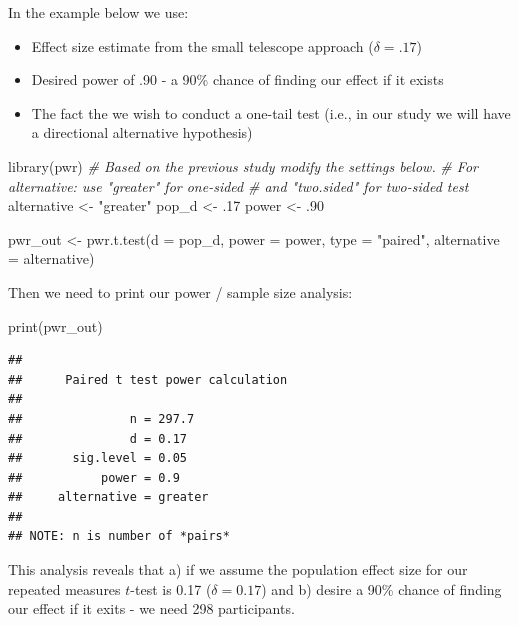 \documentclass[
]{krantz}
\makeatletter
\newenvironment{Shaded}{\begin{snugshade}}{\end{snugshade}}
\newcommand{\AttributeTok}[1]{\textcolor[rgb]{0.61,0.61,0.61}{#1}}
\newcommand{\CommentTok}[1]{\textcolor[rgb]{0.37,0.37,0.37}{\textit{#1}}}
\newcommand{\DecValTok}[1]{\textcolor[rgb]{0.06,0.06,0.06}{#1}}
\newcommand{\FunctionTok}[1]{\textcolor[rgb]{0,0,0}{#1}}
\newcommand{\NormalTok}[1]{#1}
\newcommand{\OtherTok}[1]{\textcolor[rgb]{0.37,0.37,0.37}{#1}}
\newcommand{\StringTok}[1]{\textcolor[rgb]{0.5,0.5,0.5}{#1}}
\newenvironment{kframe}{%
\medskip{}
\setlength{\fboxsep}{.8em}
 \def\at@end@of@kframe{}%
 \ifinner\ifhmode%
  \def\at@end@of@kframe{\end{minipage}}%
  \begin{minipage}{\columnwidth}%
 \fi\fi%
 \def\FrameCommand##1{\hskip\@totalleftmargin \hskip-\fboxsep
 \colorbox{shadecolor}{##1}\hskip-\fboxsep
     \hskip-\linewidth \hskip-\@totalleftmargin \hskip\columnwidth}%
 \MakeFramed {\advance\hsize-\width
   \@totalleftmargin\z@ \linewidth\hsize
   \@setminipage}}%
 {\par\unskip\endMakeFramed%
 \at@end@of@kframe}
\renewenvironment{Shaded}{\begin{kframe}}{\end{kframe}}
\makeatother
\begin{document}
In the example below we use:

\begin{itemize}
\item
  Effect size estimate from the small telescope approach (\(\delta = .17\))
\item
  Desired power of .90 - a 90\% chance of finding our effect if it exists
\item
  The fact the we wish to conduct a one-tail test (i.e., in our study we will have a directional alternative hypothesis)
\end{itemize}

\begin{Shaded}
\begin{Highlighting}[]
\FunctionTok{library}\NormalTok{(pwr)}
\CommentTok{\# Based on the previous study modify the settings below.}
\CommentTok{\# For alternative: use "greater" for one{-}sided }
\CommentTok{\# and "two.sided" for two{-}sided test}
\NormalTok{alternative }\OtherTok{\textless{}{-}} \StringTok{"greater"}
\NormalTok{pop\_d }\OtherTok{\textless{}{-}}\NormalTok{ .}\DecValTok{17}
\NormalTok{power }\OtherTok{\textless{}{-}}\NormalTok{ .}\DecValTok{90}

\NormalTok{pwr\_out }\OtherTok{\textless{}{-}} \FunctionTok{pwr.t.test}\NormalTok{(}\AttributeTok{d =}\NormalTok{ pop\_d, }
                      \AttributeTok{power =}\NormalTok{ power,}
                      \AttributeTok{type =} \StringTok{"paired"}\NormalTok{,}
                      \AttributeTok{alternative =}\NormalTok{ alternative)}
\end{Highlighting}
\end{Shaded}

Then we need to print our power / sample size analysis:

\begin{Shaded}
\begin{Highlighting}[]
\FunctionTok{print}\NormalTok{(pwr\_out)}
\end{Highlighting}
\end{Shaded}

\begin{verbatim}
## 
##      Paired t test power calculation 
## 
##               n = 297.7
##               d = 0.17
##       sig.level = 0.05
##           power = 0.9
##     alternative = greater
## 
## NOTE: n is number of *pairs*
\end{verbatim}

This analysis reveals that a) if we assume the population effect size for our repeated measures \(t\)-test is 0.17 (\(\delta = 0.17\)) and b) desire a 90\% chance of finding our effect if it exits - we need 298 participants.
\end{document}
